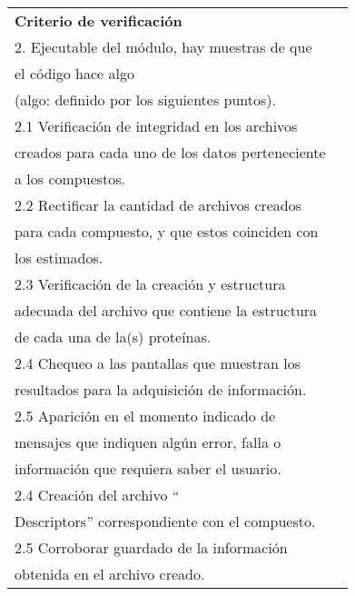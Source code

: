 \begin{longtable}{|l|l|}
\textbf{Criterio de verificación}                                                      & \begin{tabular}[c]{@{}l@{}}1. Compilación del código.\\ 2. Ejecutable del módulo, hay muestras de que \\ el código hace algo\\ (algo: definido por los siguientes puntos).\\ 2.1 Verificación de integridad en los archivos \\ creados para cada uno de los datos perteneciente \\ a los compuestos.\\ 2.2 Rectificar la cantidad de archivos creados \\ para cada compuesto, y que estos coinciden con \\ los estimados.\\ 2.3 Verificación de la creación y estructura \\ adecuada del archivo que contiene la estructura \\ de cada una de la(s) proteínas.\\ 2.4 Chequeo a las pantallas que muestran los \\ resultados para la adquisición de información.\\ 2.5 Aparición en el momento indicado de \\ mensajes que indiquen algún error, falla o \\ información que requiera saber el usuario.\\ 2.4 Creación del archivo “\\ Descriptors” correspondiente con el compuesto.\\ 2.5 Corroborar guardado de la información \\ obtenida en el archivo creado.\end{tabular}                                      \\ \hline

\end{longtable}
